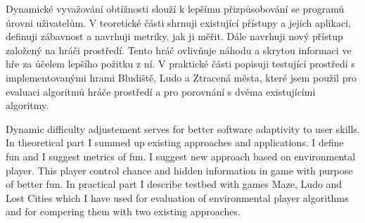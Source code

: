 \startAbstractCz
  Dynamické vyvažování obtížnosti slouží k lepšímu přizpůsobování se programů úrovni uživatelům. V teoretické části shrnuji existující přístupy a jejich aplikaci, definuji zábavnost a navrhuji metriky, jak ji měřit. Dále navrhuji nový přístup založený na hráči prostředí. Tento hráč ovlivňuje náhodu a skrytou informaci ve hře za účelem lepšího požitku z ní. V praktické části popisuji testující prostředí s implementovanými hrami Bludiště, Ludo a Ztracená města, které jsem použil pro evaluaci algoritmů hráče prostředí a pro porovnání s dvěma existujícími algoritmy.
\stopAbstractCz

\startAbstractEn
  Dynamic difficulty adjustement serves for better software adaptivity to user skills. In theoretical part I summed up existing approaches and applications. I define fun and I suggest metrics of fun. I suggest new approach based on environmental player. This player control chance and hidden information in game with purpose of better fun. In practical part I describe testbed with games Maze, Ludo and Lost Cities which I have used for evaluation of environmental player algorithms and for compering them with two existing approaches.
\stopAbstractEn

\endinput
